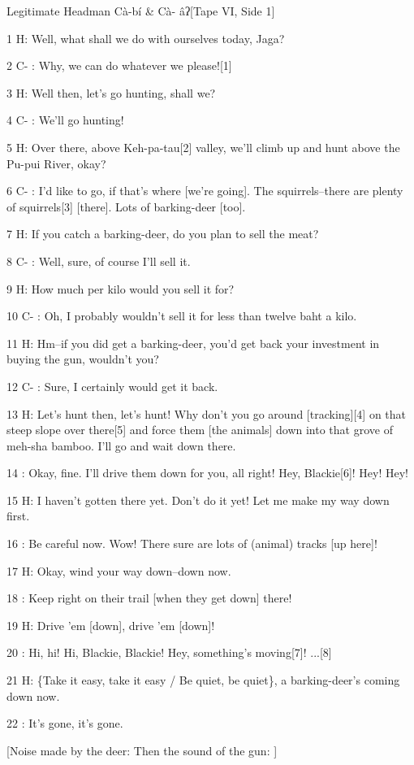 
Legitimate Headman Cà-bí \& Cà- âʔ[Tape VI, Side 1]

1 H: Well, what shall we do with ourselves today, Jaga?

2 C- : Why, we can do whatever we please![1]

3 H: Well then, let's go hunting, shall we?

4 C- : We'll go hunting!

5 H: Over there, above Keh-pa-tau[2] valley, we'll climb up and hunt above the
Pu-pui River, okay?

6 C- : I'd like to go, if that's where [we're going]. The squirrels--there are
plenty of squirrels[3] [there]. Lots of barking-deer [too].

7 H: If you catch a barking-deer, do you plan to sell the meat?

8 C- : Well, sure, of course I'll sell it.

9 H: How much per kilo would you sell it for?

10 C- : Oh, I probably wouldn't sell it for less than twelve baht a kilo.

11 H: Hm--if you did get a barking-deer, you'd get back your investment in buying
the gun, wouldn't you?

12 C- : Sure, I certainly would get it back.

13 H: Let's hunt then, let's hunt! Why don't you go around [tracking][4] on that
steep slope over there[5] and force them [the animals] down into that grove of
meh-sha bamboo. I'll go and wait down there.

14  : Okay, fine. I'll drive them down for you, all right! Hey, Blackie[6]! Hey!
Hey!

15 H: I haven't gotten there yet. Don't do it yet! Let me make my way down first.

16  : Be careful now. Wow! There sure are lots of (animal) tracks [up here]!

17 H: Okay, wind your way down--down now.

18  : Keep right on their trail [when they get down] there!

19 H: Drive 'em [down], drive 'em [down]!

20  : Hi, hi! Hi, Blackie, Blackie! Hey, something's moving[7]! ...[8]

21 H: \{Take it easy, take it easy / Be quiet, be quiet\}, a barking-deer's coming
down now.

22  : It's gone, it's gone.

[Noise made by the deer: Then the sound of the gun: ]


